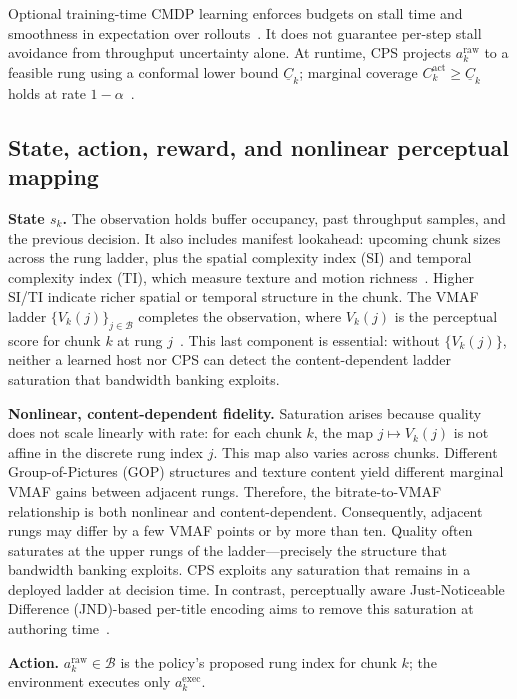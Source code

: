 Optional training-time CMDP learning enforces budgets on stall time and smoothness in expectation over rollouts~\cite{paternain2019dual,achiam2017constrained}.
It does not guarantee per-step stall avoidance from throughput uncertainty alone.
At runtime, CPS projects \(a^{\mathrm{raw}}_k\) to a feasible rung using a conformal lower bound \(\underline{C}_k\); marginal coverage \(C^{\mathrm{act}}_k\ge\underline{C}_k\) holds at rate \(1{-}\alpha\)~\cite{vovk2005algorithmic,angelopoulos2023gentle}.

\subsection{State, action, reward, and nonlinear perceptual mapping}

\textbf{State \(s_k\).}
The observation holds buffer occupancy, past throughput samples, and the previous decision.
It also includes manifest lookahead: upcoming chunk sizes across the rung ladder, plus the spatial complexity index (SI) and temporal complexity index (TI), which measure texture and motion richness~\cite{itu2023p910}.
Higher SI/TI indicate richer spatial or temporal structure in the chunk.
The VMAF ladder \(\{V_k(j)\}_{j\in\mathcal{B}}\) completes the observation, where \(V_k(j)\) is the perceptual score for chunk \(k\) at rung \(j\)~\cite{li2016vmaf}.
This last component is essential: without \(\{V_k(j)\}\), neither a learned host nor CPS can detect the content-dependent ladder saturation that bandwidth banking exploits.

\textbf{Nonlinear, content-dependent fidelity.}
Saturation arises because quality does not scale linearly with rate: for each chunk \(k\), the map \(j\mapsto V_k(j)\) is not affine in the discrete rung index \(j\).
This map also varies across chunks.
Different Group-of-Pictures (GOP) structures and texture content yield different marginal VMAF gains between adjacent rungs.
Therefore, the bitrate-to-VMAF relationship is both nonlinear and content-dependent.
Consequently, adjacent rungs may differ by a few VMAF points or by more than ten.
Quality often saturates at the upper rungs of the ladder---precisely the structure that bandwidth banking exploits.
CPS exploits any saturation that remains in a deployed ladder at decision time.
In contrast, perceptually aware Just-Noticeable Difference (JND)-based per-title encoding aims to remove this saturation at authoring time~\cite{menon2022perceptual}.

\textbf{Action.}
\(a^{\mathrm{raw}}_k\in\mathcal{B}\) is the policy's proposed rung index for chunk \(k\); the environment executes only \(a^{\mathrm{exec}}_k\).

